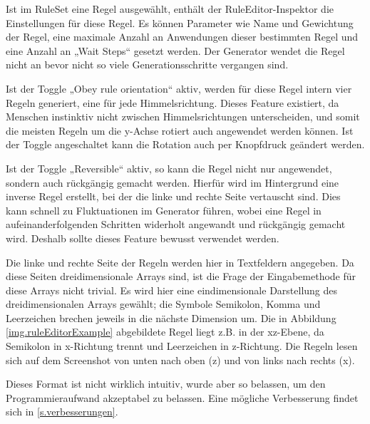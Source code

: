 
Ist im RuleSet eine Regel ausgewählt, enthält der RuleEditor-Inspektor die Einstellungen für diese Regel. Es können Parameter wie Name und Gewichtung der Regel, eine maximale Anzahl an Anwendungen dieser bestimmten Regel und eine Anzahl an „Wait Steps“ gesetzt werden. Der Generator wendet die Regel nicht an bevor nicht so viele Generationsschritte vergangen sind.

Ist der Toggle „Obey rule orientation“ aktiv, werden für diese Regel intern vier Regeln generiert, eine für jede Himmelsrichtung. Dieses Feature existiert, da Menschen instinktiv nicht zwischen Himmelsrichtungen unterscheiden, und somit die meisten Regeln um die y-Achse rotiert auch angewendet werden können. Ist der Toggle angeschaltet kann die Rotation auch per Knopfdruck geändert werden. 

Ist der Toggle „Reversible“ aktiv, so kann die Regel nicht nur angewendet, sondern auch rückgängig gemacht werden. Hierfür wird im Hintergrund eine inverse Regel erstellt, bei der die linke und rechte Seite vertauscht sind. Dies kann schnell zu Fluktuationen im Generator führen, wobei eine Regel in aufeinanderfolgenden Schritten widerholt angewandt und rückgängig gemacht wird. Deshalb sollte dieses Feature bewusst verwendet werden.

Die linke und rechte Seite der Regeln werden hier in Textfeldern angegeben. Da diese Seiten dreidimensionale Arrays sind, ist die Frage der Eingabemethode für diese Arrays nicht trivial. Es wird hier eine eindimensionale Darstellung des dreidimensionalen Arrays gewählt; die Symbole Semikolon, Komma und Leerzeichen brechen jeweils in die nächste Dimension um. Die in Abbildung \ref{img.ruleEditorExample} abgebildete Regel liegt z.B. in der xz-Ebene, da Semikolon in x-Richtung trennt und Leerzeichen in z-Richtung. Die Regeln lesen sich auf dem Screenshot von unten nach oben (z) und von links nach rechts (x).


Dieses Format ist nicht wirklich intuitiv, wurde aber so belassen, um den Programmieraufwand akzeptabel zu belassen. Eine mögliche Verbesserung findet sich in \ref{s.verbesserungen}. 

